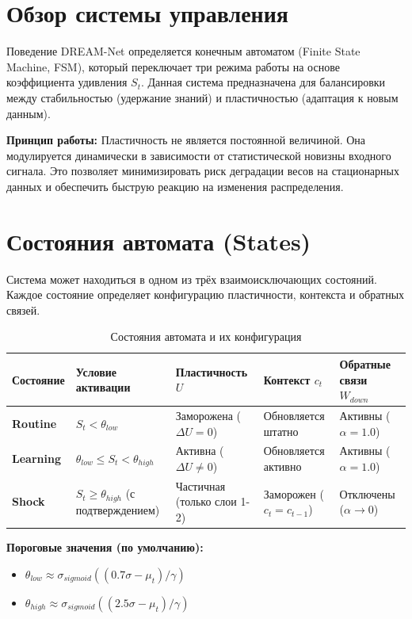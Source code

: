 \section{Обзор системы управления}

Поведение DREAM-Net определяется конечным автоматом (Finite State Machine, FSM), который переключает три режима работы на основе коэффициента удивления $S_t$. Данная система предназначена для балансировки между стабильностью (удержание знаний) и пластичностью (адаптация к новым данным).

\textbf{Принцип работы:} Пластичность не является постоянной величиной. Она модулируется динамически в зависимости от статистической новизны входного сигнала. Это позволяет минимизировать риск деградации весов на стационарных данных и обеспечить быструю реакцию на изменения распределения.

\section{Состояния автомата (States)}

Система может находиться в одном из трёх взаимоисключающих состояний. Каждое состояние определяет конфигурацию пластичности, контекста и обратных связей.

\begin{table}[h]
\centering
\caption{Состояния автомата и их конфигурация}
\label{tab:states}
\begin{tabular}{lp{4cm}p{3cm}p{3cm}p{3cm}}
\toprule
\textbf{Состояние} & \textbf{Условие активации} & \textbf{Пластичность $U$} & \textbf{Контекст $c_t$} & \textbf{Обратные связи $W_{down}$} \\
\midrule
\textbf{Routine} & $S_t < \theta_{low}$ & Заморожена ($\Delta U = 0$) & Обновляется штатно & Активны ($\alpha = 1.0$) \\
\textbf{Learning} & $\theta_{low} \leq S_t < \theta_{high}$ & Активна ($\Delta U \neq 0$) & Обновляется активно & Активны ($\alpha = 1.0$) \\
\textbf{Shock} & $S_t \geq \theta_{high}$ (с подтверждением) & Частичная (только слои 1-2) & Заморожен ($c_t = c_{t-1}$) & Отключены ($\alpha \to 0$) \\
\bottomrule
\end{tabular}
\end{table}

\textbf{Пороговые значения (по умолчанию):}
\begin{itemize}
    \item $\theta_{low} \approx \sigma_{sigmoid}((0.7\sigma - \mu_t)/\gamma)$
    \item $\theta_{high} \approx \sigma_{sigmoid}((2.5\sigma - \mu_t)/\gamma)$
\end{itemize}

